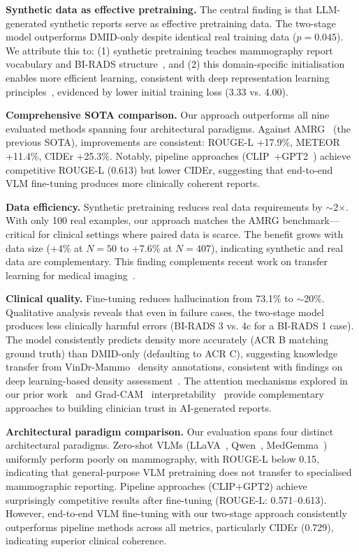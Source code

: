 \documentclass{wlscirep}
\begin{document}
\textbf{Synthetic data as effective pretraining.} The central finding is that LLM-generated synthetic reports serve as effective pretraining data. The two-stage model outperforms DMID-only despite identical real training data ($p=0.045$). We attribute this to: (1) synthetic pretraining teaches mammography report vocabulary and BI-RADS structure~\cite{birads2013}, and (2) this domain-specific initialisation enables more efficient learning, consistent with deep representation learning principles~\cite{bengio2012deep}, evidenced by lower initial training loss (3.33 vs. 4.00).

\textbf{Comprehensive SOTA comparison.} Our approach outperforms all nine evaluated methods spanning four architectural paradigms. Against AMRG~\cite{sung2025} (the previous SOTA), improvements are consistent: ROUGE-L +17.9\%, METEOR +11.4\%, CIDEr +25.3\%. Notably, pipeline approaches (CLIP~\cite{radford2021clip}+GPT2~\cite{radford2019gpt2}) achieve competitive ROUGE-L (0.613) but lower CIDEr, suggesting that end-to-end VLM fine-tuning produces more clinically coherent reports.

\textbf{Data efficiency.} Synthetic pretraining reduces real data requirements by $\sim$2$\times$. With only 100 real examples, our approach matches the AMRG benchmark---critical for clinical settings where paired data is scarce. The benefit grows with data size (+4\% at $N=50$ to +7.6\% at $N=407$), indicating synthetic and real data are complementary. This finding complements recent work on transfer learning for medical imaging~\cite{zhuang2021survey}.

\textbf{Clinical quality.} Fine-tuning reduces hallucination from 73.1\% to $\sim$20\%. Qualitative analysis reveals that even in failure cases, the two-stage model produces less clinically harmful errors (BI-RADS 3 vs. 4c for a BI-RADS 1 case). The model consistently predicts density more accurately (ACR B matching ground truth) than DMID-only (defaulting to ACR C), suggesting knowledge transfer from VinDr-Mammo~\cite{nguyen2023vindr} density annotations, consistent with findings on deep learning-based density assessment~\cite{lehman2019mammographic, gastounioti2022breast}. The attention mechanisms explored in our prior work~\cite{esen2025multitask} and Grad-CAM~\cite{selvaraju2017gradcam} interpretability~\cite{esen2025rl} provide complementary approaches to building clinician trust in AI-generated reports.

\textbf{Architectural paradigm comparison.} Our evaluation spans four distinct architectural paradigms. Zero-shot VLMs (LLaVA~\cite{liu2024llava}, Qwen~\cite{wang2024qwen2vl}, MedGemma~\cite{lin2024medgemma}) uniformly perform poorly on mammography, with ROUGE-L below 0.15, indicating that general-purpose VLM pretraining does not transfer to specialised mammographic reporting. Pipeline approaches (CLIP+GPT2) achieve surprisingly competitive results after fine-tuning (ROUGE-L: 0.571--0.613). However, end-to-end VLM fine-tuning with our two-stage approach consistently outperforms pipeline methods across all metrics, particularly CIDEr (0.729), indicating superior clinical coherence.
\end{document}
